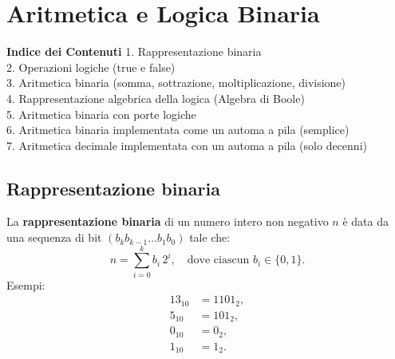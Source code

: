 \documentclass[a4paper,12pt]{report}
\begin{document}
\chapter{Aritmetica e Logica Binaria}

\vspace{1em}
\noindent
\textbf{Indice dei Contenuti}  
1. Rappresentazione binaria \dotfill \pageref{sec:binaria} \\
2. Operazioni logiche (true e false) \dotfill \pageref{sec:logiche} \\
3. Aritmetica binaria (somma, sottrazione, moltiplicazione, divisione) \dotfill \pageref{sec:arit_bin} \\
4. Rappresentazione algebrica della logica (Algebra di Boole) \dotfill \pageref{sec:algebra_boole} \\
5. Aritmetica binaria con porte logiche \dotfill \pageref{sec:porte_logiche} \\
6. Aritmetica binaria implementata come un automa a pila (semplice) \dotfill \pageref{sec:automa_bin} \\
7. Aritmetica decimale implementata con un automa a pila (solo decenni) \dotfill \pageref{sec:automa_dec} \\

\newpage

\section{Rappresentazione binaria}\label{sec:binaria}
La \textbf{rappresentazione binaria} di un numero intero non negativo \(n\) è data da una sequenza di bit \((b_k b_{k-1} \dots b_1 b_0)\) tale che:
\[
n = \sum_{i=0}^k b_i \, 2^i,
\quad \text{dove ciascun } b_i \in \{0,1\}.
\]
Esempi:
\[
\begin{aligned}
13_{10} &= 1101_2,\\
5_{10}  &= 101_2,\\
0_{10}  &= 0_2,\\
1_{10}  &= 1_2.
\end{aligned}
\]
\end{document}
